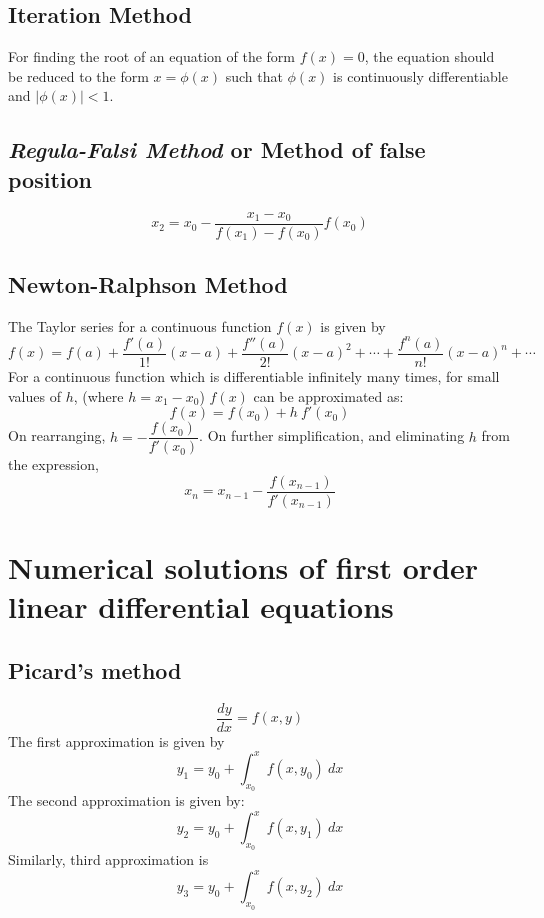 \documentclass[12pt,a4paper,landscape]{article}
\newcommand{\dydx}{\dfrac{dy}{dx}}
\begin{document}
	\subsection{Iteration Method}
	For finding the root of an equation of the form $f(x)=0$, the equation should be reduced to the form $x=\phi(x)$ such that $\phi(x)$ is continuously differentiable and $\left|\phi(x)\right|<1$.
	
	\subsection{\textit{Regula-Falsi Method} or Method of false position}
	
	\[x_2 =  x_0 - \dfrac{x_1 - x_0}{f(x_1) - f(x_0)}f(x_0)\]
	
	\subsection{Newton-Ralphson Method}
	
	The Taylor series for a continuous function $f(x)$ is given by
	\begin{equation}\label{taylor}
		f(x) =  f(a) + \dfrac{f'(a)}{1!} (x-a) + \dfrac{f''(a)}{2!}(x-a)^2 + \cdots + \dfrac{f^n (a)}{n!}(x-a)^n + \cdots
	\end{equation}
	For a continuous function which is differentiable infinitely many times, for small values of $h$, (where $h = x_1 - x_0 $) $f(x)$ can be approximated as:	
	\[f(x) = f(x_0) + h\ f'(x_0)\]
	On rearranging, $h = -\dfrac{f(x_0)}{f'(x_0)}$. On further simplification, and eliminating $h$ from the expression, 
	\begin{equation}\label{new-ralph}
		x_n = x_{n-1} - \dfrac{f(x_{n-1})}{f'(x_{n-1})} 
	\end{equation}
	
	\section{Numerical solutions of first order linear differential equations}
	
	\subsection{Picard's method}
	\[  \dydx = f(x,y) \]
	The first approximation is given by
	\begin{equation}\label{Picard}
		y_1 = y_0 + \int_{x_0}^{x} f(x,y_0)\ dx
	\end{equation}
	The second approximation is given by:
	\[ y_2 = y_0 + \int_{x_0}^{x} f(x,y_1)\ dx \]
	Similarly, third approximation is
	\[ y_3 = y_0 + \int_{x_0}^{x} f(x,y_2)\ dx \]
	
\end{document}

